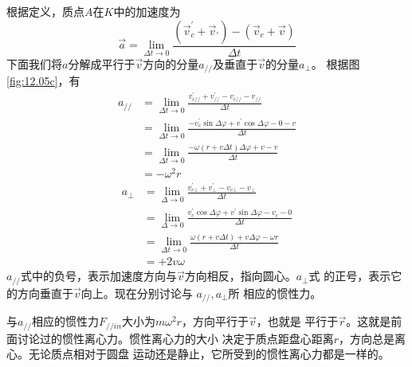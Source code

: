 根据定义，质点$ A $在$ K $中的加速度为
\begin{equation*}
  \vec{a} = \lim _ { \Delta t \to 0 } \frac { ( \vec{v} _ { c } ^ { \prime } + \vec{v} _ { \prime } ) - ( \vec{v} _ { c } + \vec{v} ) } { \Delta t }
\end{equation*}
下面我们将$ a $分解成平行于$\vec{v}$方向的分量$ a _ {//} $及垂直于$\vec{v}$的分量$ a _ \bot $。
根据图\ref{fig:12.05c}，有\\
\begin{equation}\label{eqn:12.02.04}
  \begin{aligned}
    a _ { // } & = \lim_{ \Delta t \to 0 } \frac { v _ { c// } ^ { \prime } + v _ { // } ^ { \prime } - v _ { c// } - v _ { // } } { \Delta t } \\
               & =\lim _{\Delta t \to 0} \frac{-v_{c}^{\prime} \sin \Delta \varphi+v^{\prime} \cos \Delta \varphi-0-v}{\Delta t}                \\
               & =\lim _{\Delta t \to 0} \frac{-\omega(r+v \Delta t) \Delta \varphi+v-v}{\Delta t}                                              \\
               & =-\omega^{2} r
  \end{aligned}
\end{equation}
\begin{equation}\label{eqn:12.02.05}
  \begin{aligned}
    a_{\bot} & =\lim _{\Delta \rightarrow 0} \frac{v_{c \bot}^{\prime}+v_{\bot}^{\prime}-v_{c \bot}-v_{\bot}}{\Delta t}                 \\
             & =\lim _{\Delta \rightarrow 0} \frac{v_{c}^{\prime} \cos \Delta \varphi+v^{\prime} \sin \Delta \varphi-v_{c}-0}{\Delta t} \\
             & =\lim _{\Delta t \rightarrow 0} \frac{\omega(r+v \Delta t)+v \Delta \varphi-\omega r}{\Delta t}                          \\
             & =+2 v \omega
  \end{aligned}
\end{equation}
$ a_{//} $式中的负号，表示加速度方向与$\vec{v}$方向相反，指向圆心。$ a_{\bot} $式
的正号，表示它的方向垂直于$\vec{v}$向上。现在分别讨论与 $ a_{//}, a_{\bot}$所
相应的惯性力。

与$ a_{//} $相应的惯性力$ F_{//in} $大小为$ m\omega ^ 2 r $，方向平行于$\vec{v}$，也就是
平行于$\vec{r}$。这就是前面讨论过的惯性离心力。惯性离心力的大小
决定于质点距盘心距离$ r $，方向总是离心。无论质点相对于圆盘
运动还是静止，它所受到的惯性离心力都是一样的。

